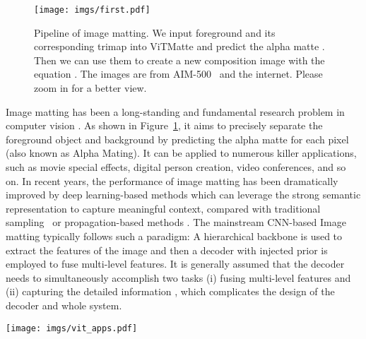 \documentclass[10pt,twocolumn,letterpaper]{article}
\newcommand{\thename}{ViTMatte}
\begin{document}
\begin{figure}
    \centering
    \texttt{[image: imgs/first.pdf]}
    \caption{Pipeline of image matting. We input foreground  and its corresponding trimap  into \thename{} and predict the alpha matte . Then we can use them to create a new composition image with the equation . The images are from AIM-500~\cite{aim500} and the internet. Please zoom in for a better view.}
    \label{fig:first}
\end{figure}

Image matting has been a long-standing and fundamental research problem in computer vision \cite{closed-form, matting_survey}. As shown in Figure~\ref{fig:first}, it aims to precisely separate the foreground object and background by predicting the alpha matte for each pixel (also known as Alpha Mating). It can be applied to numerous killer applications, such as movie special effects, digital person creation, video conferences, and so on. In recent years, the performance of image matting has been dramatically improved by deep learning-based methods \cite{DIM, sim, MGM, Tripartitle2021} which can leverage the strong semantic representation to capture meaningful context, compared with traditional sampling~\cite{matting2013, hematting2011} or propagation-based methods \cite{poissonmatting04, nonlocalmatting2011, knnmatting2013}. The mainstream CNN-based Image matting typically follows such a paradigm: A hierarchical backbone is used to extract the features of the image and then a decoder with injected prior is employed to fuse multi-level features. It is generally assumed that the decoder needs to simultaneously accomplish two tasks (i) fusing multi-level features and (ii) capturing the detailed information \cite{HAttMatting, GCAMatting,MGM}, which complicates the design of the decoder and whole system.

\begin{figure*}
    \centering
    \texttt{[image: imgs/vit\_apps.pdf]}
    \caption{Overview of \thename{} and other applications of plain vision transformers~\cite{vitdet, vitpose, vitrs}. They use a simple feature pyramid designed by ViTDet~\cite{vitdet}. Differently, we propose a new adaptation strategy, especially for image matting, named \thename{}. We use simple convolution layers to get detailed information about the image and the feature map output by plain vision transformers is used only once.}
    \label{fig:vit_apps}
\end{figure*}
\end{document}
